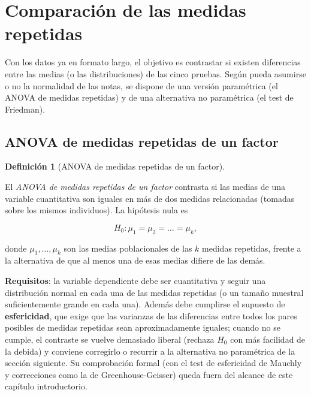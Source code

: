 \documentclass[
  spanish,
  a4paper,
]{scrreport}
\theoremstyle{definition}
\theoremstyle{definition}
\newtheorem{definition}{Definición}[chapter]
\theoremstyle{remark}
\begin{document}
\section{Comparación de las medidas
repetidas}\label{comparaciuxf3n-de-las-medidas-repetidas}

Con los datos ya en formato largo, el objetivo es contrastar si existen
diferencias entre las medias (o las distribuciones) de las cinco
pruebas. Según pueda asumirse o no la normalidad de las notas, se
dispone de una versión paramétrica (el ANOVA de medidas repetidas) y de
una alternativa no paramétrica (el test de Friedman).

\subsection{ANOVA de medidas repetidas de un
factor}\label{anova-de-medidas-repetidas-de-un-factor}

\begin{definition}[ANOVA de medidas repetidas de un
factor]\protect\hypertarget{def-medidasrepetidas-anova}{}\label{def-medidasrepetidas-anova}

El \emph{ANOVA de medidas repetidas de un factor} contrasta si las
medias de una variable cuantitativa son iguales en más de dos medidas
relacionadas (tomadas sobre los mismos individuos). La hipótesis nula es

\[H_0: \mu_1 = \mu_2 = \dots = \mu_k,\]

donde \(\mu_1, \dots, \mu_k\) son las medias poblacionales de las \(k\)
medidas repetidas, frente a la alternativa de que al menos una de esas
medias difiere de las demás.

\end{definition}

\textbf{Requisitos}: la variable dependiente debe ser cuantitativa y
seguir una distribución normal en cada una de las medidas repetidas (o
un tamaño muestral suficientemente grande en cada una). Además debe
cumplirse el supuesto de \textbf{esfericidad}, que exige que las
varianzas de las diferencias entre todos los pares posibles de medidas
repetidas sean aproximadamente iguales; cuando no se cumple, el
contraste se vuelve demasiado liberal (rechaza \(H_0\) con más facilidad
de la debida) y conviene corregirlo o recurrir a la alternativa no
paramétrica de la sección siguiente. Su comprobación formal (con el test
de esfericidad de Mauchly y correcciones como la de Greenhouse-Geisser)
queda fuera del alcance de este capítulo introductorio.
\end{document}
